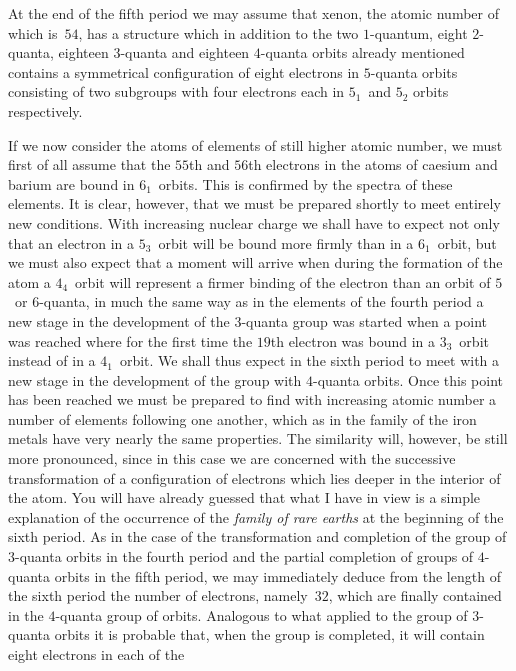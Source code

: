 At the end of the fifth period we may assume that xenon, the
atomic number of which is~$54$, has a structure which in addition to
the two $1$-quantum, eight $2$-quanta, eighteen $3$-quanta and eighteen
$4$-quanta orbits already mentioned contains a symmetrical
configuration of eight electrons in $5$-quanta orbits consisting of two
subgroups with four electrons each in $5_{1}$~and $5_{2}$ orbits respectively.

 If we now consider the atoms
of elements of still higher atomic number, we must first of all
assume that the $55$th and $56$th electrons in the atoms of caesium
and barium are bound in $6_{1}$~orbits. This is confirmed by the spectra
of these elements. It is clear, however, that we must be prepared
shortly to meet entirely new conditions. With increasing nuclear
charge we shall have to expect not only that an electron in a $5_{3}$~orbit
will be bound more firmly than in a $6_{1}$~orbit, but we must also
expect that a moment will arrive when during the formation of the
atom a $4_{4}$~orbit will represent a firmer binding of the electron than
an orbit of $5$~or $6$-quanta, in much the same way as in the elements
of the fourth period a new stage in the development of the $3$-quanta
group was started when a point was reached where for the first
time the $19$th electron was bound in a $3_{3}$~orbit instead of in a $4_{1}$~orbit.
We shall thus expect in the sixth period to meet with a new
stage in the development of the group with $4$-quanta orbits. Once
this point has been reached we must be prepared to find with increasing
atomic number a number of elements following one another,
which as in the family of the iron metals have very nearly the same
properties. The similarity will, however, be still more pronounced,
since in this case we are concerned with the successive transformation
of a configuration of electrons which lies deeper in the interior
of the atom. You will have already guessed that what I have in view
is a simple explanation of the occurrence of the \emph{family of rare earths}
at the beginning of the sixth period. As in the case of the transformation
and completion of the group of $3$-quanta orbits in the fourth
period and the partial completion of groups of $4$-quanta orbits in
the fifth period, we may immediately deduce from the length of the
sixth period the number of electrons, namely~$32$, which are finally
contained in the $4$-quanta group of orbits. Analogous to what
applied to the group of $3$-quanta orbits it is probable that, when
the group is completed, it will contain eight electrons in each of the
